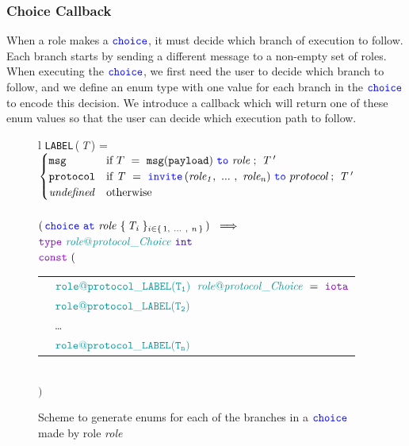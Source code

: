\documentclass[12pt,twoside]{report}
\begin{document}
\subsubsection{Choice Callback}

When a role makes a ${\color{blue}\mathtt{choice}}$, it must decide which branch of execution to follow. Each branch starts by sending a different message to a non-empty set of roles. When executing the ${\color{blue}\mathtt{choice}}$, we first need the user to decide which branch to follow, and we define an enum type with one value for each branch in the ${\color{blue}\mathtt{choice}}$ to encode this decision. We introduce a callback which will return one of these enum values so that the user can decide which execution path to follow.

\begin{figure}[!h]
    \begin{center}
        \begin{tabular}{l}
            \texttt{LABEL}\,(\,\textit{T}\,) = \\[3pt]
            \begin{math}
                \begin{cases}
                    \varname{msg} & \text{if}\ T\ =\ \scrmessage{msg}{payload}\ \scrto\ \mathit{role}\;;\ \mathit{T\,'}\\
                    \varname{protocol} & \text{if}\ \mathit{T}\ =\ \invite\,(\roles{role}{n})\ \scrto\ protocol\,;\ \mathit{T\,'}\\
                    \mathit{undefined} & \text{otherwise}
                \end{cases}
            \end{math}\\\\[6pt]

            $(\,\choice\ \at\ \mathit{role}\ \{\,\mathit{T_i}\;\}_{\varinset{i}{\{\,1,\ \dots\ ,\ n\,\}}}\,)\ \implies$\\[10pt]
            
            $\gotype\ \enumtype{\localprotocol{role}{protocol}\_Choice}\ \typename{int}$\\[6pt]
            $\goconst\ ($\\[3pt]
            \begin{tabular}{ll}
                \indent & $\enumvalue{\localprotocol{role}{protocol}\_LABEL(T_1)}\;\ \enumtype{\localprotocol{role}{protocol}\_Choice}\ =\ \goiota$ \\
                \indent & $\enumvalue{\localprotocol{role}{protocol}\_LABEL(T_2)}$ \\
                \indent & \dots \\
                \indent & $\enumvalue{\localprotocol{role}{protocol}\_LABEL(T_n)}$ \\
            \end{tabular}\\[3pt]
            $)$
        \end{tabular}
    \end{center}
    
    \caption{Scheme to generate enums for each of the branches in a ${\color{blue}\mathtt{choice}}$ made by role \textit{role}}
    \label{choice-enum-gen}
\end{figure}
\end{document}
